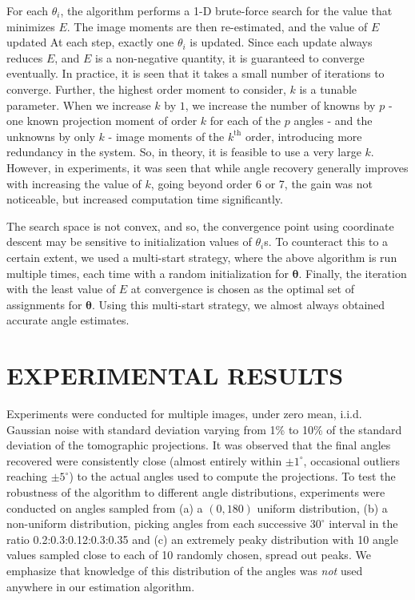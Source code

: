 \documentclass{article}
\begin{document}
For each $\theta_i$, the algorithm performs a 1-D brute-force search for the value that minimizes $E$. The image moments are then re-estimated, and the value of $E$ updated
At each step, exactly one $\theta_i$ is updated. Since each update always reduces $E$, and $E$ is a non-negative quantity, it is guaranteed to converge eventually. In practice, it is seen that it takes a small number of iterations to converge. Further, the highest order moment to consider, $k$ is a tunable parameter. When we increase $k$ by $1$, we increase the number of knowns by $p$ - one known projection moment of order $k$ for each of the $p$ angles - and the unknowns by only $k$ - image moments of the $k^\textrm{th}$ order, introducing more redundancy in the system. So, in theory, it is feasible to use a very large $k$. However, in experiments, it was seen that while angle recovery generally improves with increasing the value of $k$, going beyond order 6 or 7, the gain was not noticeable, but increased computation time significantly.

The search space is not convex, and so, the convergence point using coordinate descent may be sensitive to initialization values of $\theta_i$s. To counteract this to a certain extent, we used a multi-start strategy, where the above algorithm is run multiple times, each time with a random initialization for $\bm\theta$. Finally, the iteration with the least value of $E$ at convergence is chosen as the optimal set of assignments for $\bm{\theta}$. Using this multi-start strategy, we almost always obtained accurate angle estimates.

\section{EXPERIMENTAL RESULTS}
\label{sec:results}
Experiments were conducted for multiple images, under zero mean, i.i.d. Gaussian noise with standard deviation varying from 1\% to 10\% of the standard deviation of the tomographic projections. It was observed that the final angles recovered were consistently close (almost entirely within $\pm 1^{\circ}$, occasional outliers reaching $\pm 5^{\circ}$) to the actual angles used to compute the projections. To test the robustness of the algorithm to different angle distributions, experiments were conducted on angles sampled from (a) a $(0,180) $ uniform distribution, (b) a non-uniform distribution, picking angles from each successive $30^{\circ}$ interval in the ratio 0.2:0.3:0.12:0.3:0.35 and (c) an extremely peaky distribution with 10 angle values sampled close to each of 10 randomly chosen, spread out peaks. We emphasize that knowledge of this distribution of the angles was \emph{not} used anywhere in our estimation algorithm. 
\end{document}
